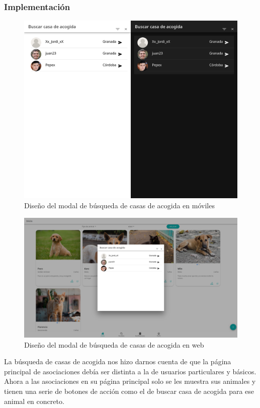 \subsubsection{Implementación}

\begin{figure} [H]
	\centering
	\includegraphics[width=0.8\linewidth]{sprint 3//hu13/implementacion.png}
	\caption{Diseño del modal de búsqueda de casas de acogida en móviles}
	\label{fig:impBusquedaAcogida}
\end{figure}

\begin{figure}[H]
	\centering
	\includegraphics[width=0.8\linewidth]{sprint 3//hu13/implementacionWeb.png}
	\caption{Diseño del modal de búsqueda de casas de acogida en web}
\end{figure}

La búsqueda de casas de acogida nos hizo darnos cuenta de que la página principal de asociaciones debía ser distinta a la de usuarios particulares y básicos. Ahora a las asociaciones en su página principal solo se les muestra sus animales y tienen una serie de botones de acción como el de buscar casa de acogida para ese animal en concreto.

